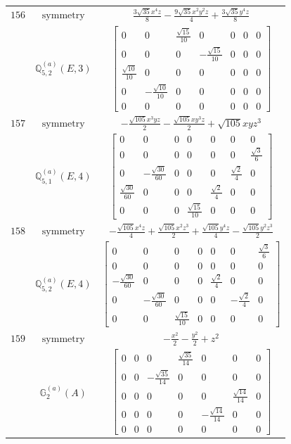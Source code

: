 \documentclass[fleqn,8pt,landscape]{jsarticle}
\begin{document}
\begin{longtable}{ccc}
$ 156 $ & $ \text{symmetry} $ & $ \frac{3 \sqrt{35} x^{4} z}{8} - \frac{9 \sqrt{35} x^{2} y^{2} z}{4} + \frac{3 \sqrt{35} y^{4} z}{8} $ \\
$  $ & $ \mathbb{Q}_{5,2}^{(a)}(E,3) $ & $ \begin{bmatrix} 0 & 0 & \frac{\sqrt{15}}{10} & 0 & 0 & 0 & 0 \\ 0 & 0 & 0 & - \frac{\sqrt{15}}{10} & 0 & 0 & 0 \\ \frac{\sqrt{10}}{10} & 0 & 0 & 0 & 0 & 0 & 0 \\ 0 & - \frac{\sqrt{10}}{10} & 0 & 0 & 0 & 0 & 0 \\ 0 & 0 & 0 & 0 & 0 & 0 & 0 \end{bmatrix} $ \\ \hline
$ 157 $ & $ \text{symmetry} $ & $ - \frac{\sqrt{105} x^{3} y z}{2} - \frac{\sqrt{105} x y^{3} z}{2} + \sqrt{105} x y z^{3} $ \\
$  $ & $ \mathbb{Q}_{5,1}^{(a)}(E,4) $ & $ \begin{bmatrix} 0 & 0 & 0 & 0 & 0 & 0 & 0 \\ 0 & 0 & 0 & 0 & 0 & 0 & \frac{\sqrt{3}}{6} \\ 0 & - \frac{\sqrt{30}}{60} & 0 & 0 & 0 & \frac{\sqrt{2}}{4} & 0 \\ \frac{\sqrt{30}}{60} & 0 & 0 & 0 & \frac{\sqrt{2}}{4} & 0 & 0 \\ 0 & 0 & 0 & \frac{\sqrt{15}}{10} & 0 & 0 & 0 \end{bmatrix} $ \\ \hline
$ 158 $ & $ \text{symmetry} $ & $ - \frac{\sqrt{105} x^{4} z}{4} + \frac{\sqrt{105} x^{2} z^{3}}{2} + \frac{\sqrt{105} y^{4} z}{4} - \frac{\sqrt{105} y^{2} z^{3}}{2} $ \\
$  $ & $ \mathbb{Q}_{5,2}^{(a)}(E,4) $ & $ \begin{bmatrix} 0 & 0 & 0 & 0 & 0 & 0 & \frac{\sqrt{3}}{6} \\ 0 & 0 & 0 & 0 & 0 & 0 & 0 \\ - \frac{\sqrt{30}}{60} & 0 & 0 & 0 & \frac{\sqrt{2}}{4} & 0 & 0 \\ 0 & - \frac{\sqrt{30}}{60} & 0 & 0 & 0 & - \frac{\sqrt{2}}{4} & 0 \\ 0 & 0 & \frac{\sqrt{15}}{10} & 0 & 0 & 0 & 0 \end{bmatrix} $ \\ \hline
$ 159 $ & $ \text{symmetry} $ & $ - \frac{x^{2}}{2} - \frac{y^{2}}{2} + z^{2} $ \\
$  $ & $ \mathbb{G}_{2}^{(a)}(A) $ & $ \begin{bmatrix} 0 & 0 & 0 & \frac{\sqrt{35}}{14} & 0 & 0 & 0 \\ 0 & 0 & - \frac{\sqrt{35}}{14} & 0 & 0 & 0 & 0 \\ 0 & 0 & 0 & 0 & 0 & \frac{\sqrt{14}}{14} & 0 \\ 0 & 0 & 0 & 0 & - \frac{\sqrt{14}}{14} & 0 & 0 \\ 0 & 0 & 0 & 0 & 0 & 0 & 0 \end{bmatrix} $ \\ \hline

\end{longtable}
\end{document}
